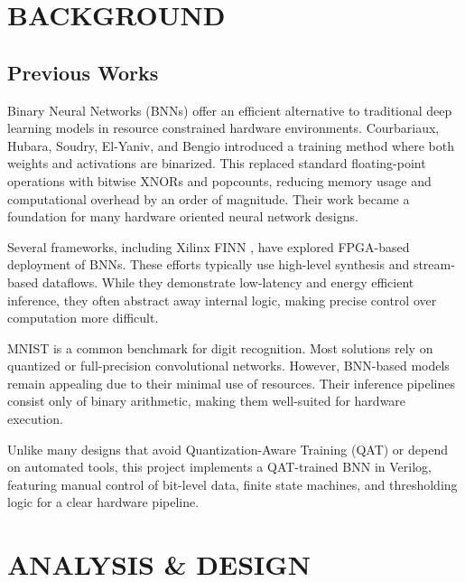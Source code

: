\documentclass[a4paper,12pt]{report}
\begin{document}
\chapter{BACKGROUND}
\label{background}

\section{Previous Works}
Binary Neural Networks (BNNs) offer an efficient alternative to traditional deep learning models in resource constrained hardware environments. Courbariaux, Hubara, Soudry, El-Yaniv, and Bengio \cite{courbariaux2016binarizedneuralnetworkstraining} introduced a training method where both weights and activations are binarized. This replaced standard floating-point operations with bitwise XNORs and popcounts, reducing memory usage and computational overhead by an order of magnitude. Their work became a foundation for many hardware oriented neural network designs.

Several frameworks, including Xilinx FINN \cite{10.1145/3020078.3021744}, have explored FPGA-based deployment of BNNs. These efforts typically use high-level synthesis and stream-based dataflows. While they demonstrate low-latency and energy efficient inference, they often abstract away internal logic, making precise control over computation more difficult.

MNIST is a common benchmark for digit recognition. Most solutions rely on quantized or full-precision convolutional networks. However, BNN-based models remain appealing due to their minimal use of resources. Their inference pipelines consist only of binary arithmetic, making them well-suited for hardware execution.

Unlike many designs that avoid Quantization-Aware Training (QAT) or depend on automated tools, this project implements a QAT-trained BNN in Verilog, featuring manual control of bit-level data, finite state machines, and thresholding logic for a clear hardware pipeline.



\clearpage
\chapter{ANALYSIS \& DESIGN}
\label{chapter:analysis_and_design}

\end{document}
